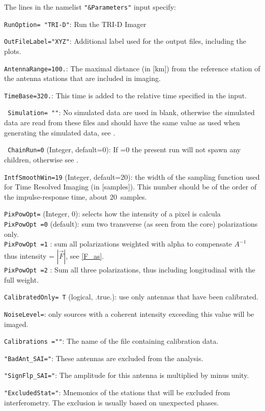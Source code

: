 The lines in the namelist \verb!"&Parameters"! input specify:
\begin{enumerate*}
\item \verb!RunOption= "TRI-D"!: Run the TRI-D Imager
\item \verb!OutFileLabel="XYZ"!: Additional label used for the output files, including the plots.
\item \verb!AntennaRange=100.!: The maximal distance (in [km]) from the reference station of the antenna stations that are included in imaging.
\item \verb!TimeBase=320.!: This time is added to the relative time specified in the input.
\item \verb# Simulation= ""#: No simulated data are used in blank, otherwise the simulated data are read from these files and should have the same value as used when generating the simulated data, see .
\item \verb# ChainRun=0# (Integer, default=0): If =0 the present run will not spawn any children, otherwise see .
\item \verb!IntfSmoothWin=19! (Integer, default=20): the width of the sampling function used for Time Resolved Imaging (in [samples]). This number should be of the order of the impulse-response time, about 20~samples.
\item \verb!PixPowOpt=! (Integer, 0): selects how the intensity of a pixel is calcula
   \\\verb!PixPowOpt =0! (default): sum two transverse (as seen from the core) polarizations only.
   \\\verb!PixPowOpt =1! : sum all polarizations weighted with alpha to compensate $A^{-1}$ thus intensity =  $|\vec{F}|$, see \eqref{F_as}.
   \\\verb!PixPowOpt =2! : Sum all three polarizations, thus including longitudinal with the full weight.
\item \verb!CalibratedOnly= T! (logical, .true.): use only antennas that have been calibrated.
\item \verb!NoiseLevel=!: only sources with a coherent intensity exceeding this value will be imaged.
\item \verb!Calibrations =""!: The name of the file containing calibration data.
\item \verb!"BadAnt_SAI="!: These antennas are excluded from the analysis.
\item \verb!"SignFlp_SAI="!: The amplitude for this antenna is multiplied by minus unity.
\item \verb!"ExcludedStat="!: Mnemonics of the stations that will be excluded from interferometry. The exclusion is usually based on unexpected phases.
\end{enumerate*}


